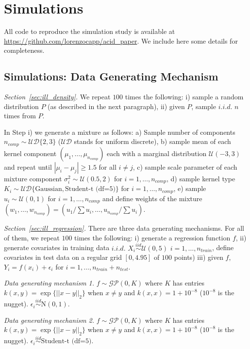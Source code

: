 \documentclass{article}
\theoremstyle{definition}
\newcommand{\iidsim}{\overset{iid}{\sim}} %
\renewcommand{\&}{and}
\begin{document}
\section{Simulations}

All code to reproduce the simulation study is available at \url{https://github.com/lorenzocapp/acid_paper}. We include here some details for completeness. 

\subsection{Simulations: Data Generating Mechanism}\label{sec:data_generation}

\noindent \textit{Section~\ref{sec:ill_density}.} We repeat $100$ times the following: i) sample a random distribution $P$ (as described in the next paragraph), ii) given $P$, sample $i.i.d.$ $n$ times from $P$. 

In Step i) we generate a mixture as follows: a) Sample number of components $n_{comp}\sim \mathcal{U}\mathcal{D}\{2,3\}$ ($\mathcal{U}\mathcal{D}$ stands for uniform discrete), b) sample mean of each kernel component $(\mu_1,\ldots,\mu_{n_{comp}})$ each with a marginal distribution $\mathcal{U}(-3,3)$ and repeat until $|\mu_i-\mu_j| \geq 1.5$ for all $i\neq j$, c) sample scale parameter of each mixture component $\sigma^2_i \sim \mathcal{U}(0.5,2)$ for $i=1,\ldots,n_{comp}$, d) sample kernel type $K_i\sim \mathcal{U}\mathcal{D}\{\text{Gaussian},\text{Student-t (df=5)}\}$ for $i=1,\ldots,n_{comp}$, e) sample $u_i \sim \mathcal{U}(0,1)$ for $i=1,\ldots,n_{comp}$ and define weights of the mixture $(w_1,\ldots,w_{n_{comp}})=(u_1/\sum u_i, \ldots, u_{n_{comp}}/\sum u_i)$.


\noindent \textit{Section~\ref{sec:ill_regression}.} There are three data generating mechanisms. For all of them, we repeat $100$ times the following: i) generate a regression function $f$, ii) generate covariates in training data $i.i.d.$ $X_i \iidsim \mathcal{U}(0,5)$ $i=1,\ldots, n_{train}$, define covariates in test data on a regular grid $[0,4.95]$ of $100$ points) iii) given $f$, $Y_i = f(x_i) + \epsilon_i$ for $i=1,\ldots, n_{train}+n_{test}$.

\textit{Data generating mechanism 1.} $f\sim \mathcal{GP} (0, K)$ where $K$ has entries $k(x,y)=\exp\{||x-y||_2\}$ when $x\neq y$ and $k(x,x)=1+10^{-8}$ ($10^{-8}$ is the nugget). $\epsilon_i \iidsim \text{N}(0,1)$. 

\textit{Data generating mechanism 2.} $f\sim \mathcal{GP} (0, K)$ where $K$ has entries $k(x,y)=\exp\{||x-y||_2\}$ when $x\neq y$ and $k(x,x)=1+10^{-8}$ ($10^{-8}$ is the nugget). $\epsilon_i \iidsim \text{Student-t (df=5)}$. 
\end{document}
